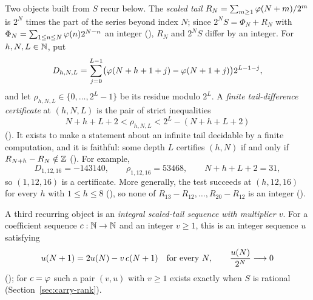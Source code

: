 \documentclass[11pt]{article}
\newcommand{\Stot}{S}
\begin{document}
Two objects built from $\Stot$ recur below.  The \emph{scaled tail}
$R_N=\sum_{m\ge1}\varphi(N+m)/2^m$ is $2^N$ times the part of the series beyond
index $N$; since $2^N\Stot=\Phi_N+R_N$ with
$\Phi_N=\sum_{1\le n\le N}\varphi(n)2^{N-n}$ an integer
(),
$R_N$ and $2^N\Stot$ differ by an integer.  For $h,N,L\in\mathbb{N}$, put
\[
  D_{h,N,L}
  =
  \sum_{j=0}^{L-1}
  \bigl(\varphi(N+h+1+j)-\varphi(N+1+j)\bigr)2^{L-1-j},
\]
and let $\rho_{h,N,L}\in\{0,\dots,2^L-1\}$ be its residue modulo $2^L$.
A \emph{finite tail-difference certificate} at $(h,N,L)$ is the pair of
strict inequalities
\[
  N+h+L+2<\rho_{h,N,L}<2^L-(N+h+L+2)
\]
().
It exists to make a statement about an infinite tail decidable by a finite
computation, and it is faithful: some depth $L$ certifies $(h,N)$ if and only
if $R_{N+h}-R_N\notin\mathbb{Z}$
().
For example,
\[
  D_{1,12,16}=-143140,\qquad
  \rho_{1,12,16}=53468,\qquad N+h+L+2=31,
\]
so $(1,12,16)$ is a certificate.  More generally, the test succeeds at
$(h,12,16)$ for every $h$ with $1\le h\le8$
(),
so none of $R_{13}-R_{12},\dots,R_{20}-R_{12}$ is an integer
().

A third recurring object is an \emph{integral scaled-tail sequence with
multiplier $v$}.  For a coefficient sequence $c:\mathbb{N}\to\mathbb{N}$ and an integer
$v\ge1$, this
is an integer sequence $u$ satisfying
\[
  u(N+1)=2u(N)-v\,c(N+1)\quad\hbox{for every }N,
  \qquad
  \frac{u(N)}{2^N}\longrightarrow0
\]
();
for $c=\varphi$ such a pair $(v,u)$ with $v\ge1$ exists exactly when $\Stot$ is
rational (Section~\ref{sec:carry-rank}).
\end{document}
